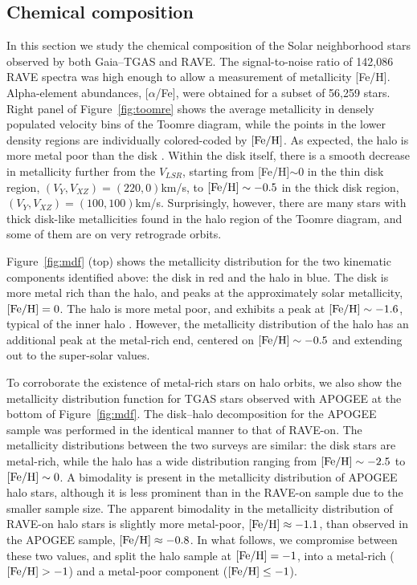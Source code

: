 \documentclass[apj, twocolappendix, numberedappendix, appendixfloats]{emulateapj}
\begin{document}
\subsection{Chemical composition}
\label{sec:chem}
In this section we study the chemical composition of the Solar neighborhood stars observed by both Gaia--TGAS and RAVE.
The signal-to-noise ratio of 142,086 RAVE spectra was high enough to allow a measurement of metallicity [Fe/H].
Alpha-element abundances, [$\alpha$/Fe], were obtained for a subset of 56,259 stars.
Right panel of Figure~\ref{fig:toomre} shows the average metallicity in densely populated velocity bins of the Toomre diagram, while the points in the lower density regions are individually colored-coded by $\rm[Fe/H]$.
As expected, the halo is more metal poor than the disk \citep[e.g.,][]{gilmore1989, ivezic2008}.
Within the disk itself, there is a smooth decrease in metallicity further from the $V_{LSR}$, starting from [Fe/H]$\sim0$ in the thin disk region, $(V_Y, V_{XZ})=(220,0)$\;km/s, to $\rm[Fe/H]\sim-0.5$ in the thick disk region, $(V_Y, V_{XZ})=(100,100)$\;km/s.
Surprisingly, however, there are many stars with thick disk-like metallicities found in the halo region of the Toomre diagram, and some of them are on very retrograde orbits.

Figure~\ref{fig:mdf} (top) shows the metallicity distribution for the two kinematic components identified above: the disk in red and the halo in blue.
The disk is more metal rich than the halo, and peaks at the approximately solar metallicity, $\rm[Fe/H]=0$.
The halo is more metal poor, and exhibits a peak at $\rm[Fe/H]\sim-1.6$, typical of the inner halo \citep[e.g.,][]{allende-prieto2006}.
However, the metallicity distribution of the halo has an additional peak at the metal-rich end, centered on $\rm[Fe/H]\sim-0.5$ and extending out to the super-solar values.

To corroborate the existence of metal-rich stars on halo orbits, we also show the metallicity distribution function for TGAS stars observed with APOGEE at the bottom of Figure~\ref{fig:mdf}.
The disk--halo decomposition for the APOGEE sample was performed in the identical manner to that of RAVE-on.
The metallicity distributions between the two surveys are similar: the disk stars are metal-rich, while the halo has a wide distribution ranging from $\rm[Fe/H]\sim-2.5$ to $\rm[Fe/H]\sim0$.
A bimodality is present in the metallicity distribution of APOGEE halo stars, although it is less prominent than in the RAVE-on sample due to the smaller sample size.
The apparent bimodality in the metallicity distribution of RAVE-on halo stars is slightly more metal-poor, $\rm[Fe/H]\approx-1.1$, than observed in the APOGEE sample, $\rm[Fe/H]\approx-0.8$.
In what follows, we compromise between these two values, and split the halo sample at $\rm[Fe/H]=-1$, into a metal-rich ($\rm[Fe/H]>-1$) and a metal-poor component ($\rm[Fe/H]\leq-1$).
\end{document}
